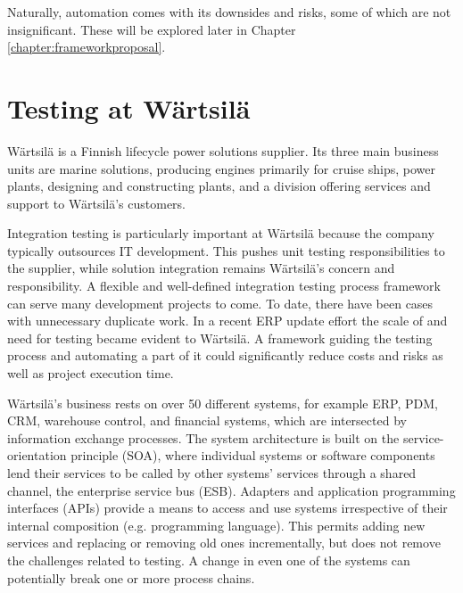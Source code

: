 \documentclass[12pt,a4paper,oneside,pdftex]{report}
\begin{document}
Naturally, automation comes with its downsides and risks, some of which are not insignificant. These will be explored later in Chapter \ref{chapter:frameworkproposal}. %

\section{Testing at Wärtsilä}

Wärtsilä is a Finnish lifecycle power solutions supplier. Its three main business units are marine solutions, producing engines primarily for cruise ships, power plants, designing and constructing plants, and a division offering services and support to Wärtsilä's customers.


Integration testing is particularly important at Wärtsilä because the company typically outsources IT development. This pushes unit testing responsibilities to the supplier, while solution integration remains Wärtsilä's concern and responsibility. A flexible and well-defined integration testing process framework can serve many development projects to come. To date, there have been cases with unnecessary duplicate work. In a recent ERP update effort the scale of and need for testing became evident to Wärtsilä. A framework guiding the testing process and automating a part of it could significantly reduce costs and risks as well as project execution time.

Wärtsilä's business rests on over 50 different systems, for example ERP, PDM, CRM, warehouse control, and financial systems, which are intersected by information exchange processes. The system architecture is built on the service-orientation principle (SOA), where individual systems or software components lend their services to be called by other systems' services through a shared channel, the enterprise service bus (ESB). Adapters and application programming interfaces (APIs) provide a means to access and use systems irrespective of their internal composition (e.g. programming language). This permits adding new services and replacing or removing old ones incrementally, but does not remove the challenges related to testing. A change in even one of the systems can potentially break one or more process chains. 
\end{document}
